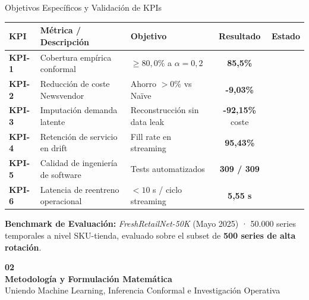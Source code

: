 \documentclass[aspectratio=169, 10pt]{beamer}
\newcommand{\cmark}{\textcolor{EmeraldGreen}{\textbf{\checkmark}}}
\begin{document}
\begin{frame}{Objetivos Específicos y Validación de KPIs}
  \begin{table}[h]
    \centering
    \small
    \begin{tabular}{lllcc}
      \toprule
      \textbf{KPI} & \textbf{Métrica / Descripción} & \textbf{Objetivo} & \textbf{Resultado} & \textbf{Estado} \\
      \midrule
      \textbf{KPI-1} & Cobertura empírica conformal & $\ge 80{,}0\%$ a $\alpha=0{,}2$ & \textbf{85,5\%} & \cmark \\
      \textbf{KPI-2} & Reducción de coste Newsvendor & Ahorro $> 0\%$ vs Naïve & \textbf{-9,03\%} & \cmark \\
      \textbf{KPI-3} & Imputación demanda latente & Reconstrucción sin data leak & \textbf{-92,15\%} coste & \cmark \\
      \textbf{KPI-4} & Retención de servicio en drift & Fill rate en streaming & \textbf{95,43\%} & \cmark \\
      \textbf{KPI-5} & Calidad de ingeniería de software & Tests automatizados & \textbf{309 / 309} & \cmark \\
      \textbf{KPI-6} & Latencia de reentreno operacional & $< 10$ s / ciclo streaming & \textbf{5,55 s} & \cmark \\
      \bottomrule
    \end{tabular}
  \end{table}
  \vspace{0.2cm}
  \begin{herocard}
    \small \textbf{Benchmark de Evaluación:} \textit{FreshRetailNet-50K} (Mayo 2025) · 50.000 series temporales a nivel SKU-tienda, evaluado sobre el subset de \textbf{500 series de alta rotación}.
  \end{herocard}
\end{frame}

\begin{frame}[standout]
  \Huge \textbf{02} \\[0.4cm]
  \Large \textbf{Metodología y Formulación Matemática} \\[0.2cm]
  \normalsize Uniendo Machine Learning, Inferencia Conformal e Investigación Operativa
\end{frame}
\end{document}
